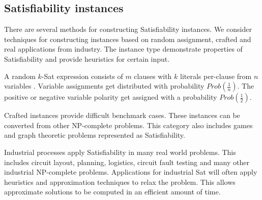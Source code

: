 	\subsection{{\sc Satisfiability} instances}
		
There are several methods for constructing {\sc Satisfiability} instances.  We consider techniques for constructing instances based on random assignment, crafted and real applications from industry.  The instance type demonstrate properties of {\sc Satisfiability} and provide heuristics for certain input.
	
A random $k$-{\sc Sat} expression consists of $m$ clauses with $k$ literals per-clause from  $n$ variables \cite{wilsonKsat}. Variable assignments get distributed with probability $Prob\left(\frac{1}{n}\right)$.  The positive or negative variable polarity get assigned with a probability $Prob\left(\frac{1}{2}\right)$.


		

Crafted instances provide difficult benchmark cases.  These instances can be converted from other \textsf{NP-complete} problems.  This category also includes games and graph theoretic problems represented as {\sc Satisfiability}. 
		
		

Industrial processes apply {\sc Satisfiability} in many real world problems.  This includes circuit layout, planning, logistics, circuit fault testing and many other industrial \textsf{NP-complete} problems.  Applications for industrial {\sc Sat} will often apply heuristics and approximation techniques to relax the problem.  This allows approximate solutions to be computed in an efficient amount of time.
		